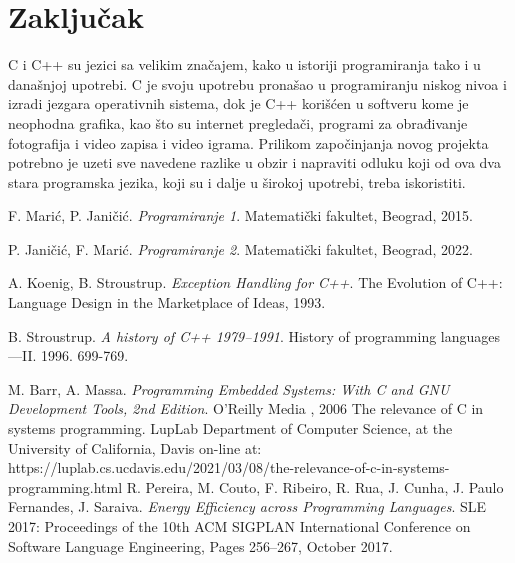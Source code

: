 \documentclass[a4paper]{article}
\begin{document}
\section{Zaključak}
\label{sec:zakljucak}
C i C++ su jezici sa velikim značajem, kako u istoriji programiranja tako i u današnjoj upotrebi. C je svoju upotrebu pronašao u programiranju niskog nivoa i izradi jezgara operativnih sistema, dok je C++ korišćen u softveru kome je neophodna grafika, kao što su internet pregledači, programi za obrađivanje fotografija i video zapisa i video igrama. Prilikom započinjanja novog projekta potrebno je uzeti sve navedene razlike u obzir i napraviti odluku koji od ova dva stara programska jezika, koji su i dalje u širokoj upotrebi, treba iskoristiti.


\appendix

\begin{thebibliography}{9}

 F. Marić, P. Janičić. \emph{Programiranje 1}. Matematički fakultet, Beograd, 2015.

 P. Janičić, F. Marić. \emph{Programiranje 2}. Matematički fakultet, Beograd, 2022.

 A. Koenig, B. Stroustrup. \emph{Exception Handling for C++}. The Evolution of C++: Language Design in the Marketplace of Ideas, 1993.

 B. Stroustrup. \emph{A history of C++ 1979--1991}. History of programming languages---II. 1996. 699-769.

 M. Barr, A. Massa. \emph{Programming Embedded Systems: With C and GNU Development Tools, 2nd Edition}. O'Reilly Media , 2006
The relevance of C in systems programming. LupLab  Department of Computer Science, at the University of California, Davis on-line at: https://luplab.cs.ucdavis.edu/2021/03/08/the-relevance-of-c-in-systems-programming.html
 R. Pereira, M. Couto, F. Ribeiro, R. Rua, J. Cunha, J. Paulo Fernandes, J. Saraiva.  \emph{Energy Efficiency across Programming Languages}. SLE 2017: Proceedings of the 10th ACM SIGPLAN International Conference on Software Language Engineering, Pages 256–267, October 2017.
\end{thebibliography}
\end{document}
